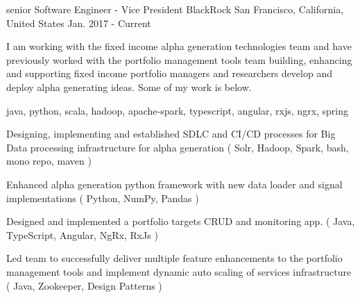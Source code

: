 \cventry
    {senior Software Engineer - Vice President} %
    {BlackRock} %
    {San Francisco, California, United States} %
    {Jan. 2017 - Current} %
    {
    \begin{cvitems} %
        I am working with the fixed income alpha generation technologies team and have previously worked with the portfolio management tools team building,
    enhancing and supporting fixed income portfolio managers and researchers develop and deploy alpha generating ideas. Some of my work is below.
        \item { java, python, scala, hadoop, apache-spark, typescript, angular, rxjs, ngrx, spring}
        \item { Designing, implementing and established SDLC and CI/CD processes for Big Data processing infrastructure for alpha generation ( Solr, Hadoop, Spark,
        bash, mono repo, maven ) }
        \item { Enhanced alpha generation python framework with new data loader and signal implementations ( Python, NumPy, Pandas )}
        \item { Designed and implemented a portfolio targets CRUD and monitoring app. ( Java, TypeScript, Angular, NgRx, RxJs )  }
        \item { Led team to successfully deliver multiple feature enhancements to the portfolio management tools and implement dynamic auto scaling of services
        infrastructure ( Java, Zookeeper, Design Patterns )}
    \end{cvitems}
    }





